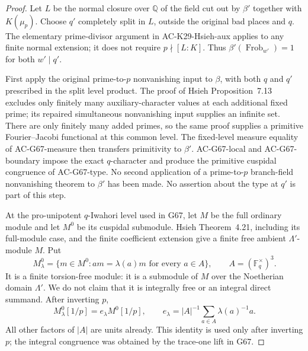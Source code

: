 \begin{proof}
Let $L$ be the normal closure over $\mathbb Q$ of the field
cut out by $\beta'$ together with $K(\mu_p)$.
Choose $q'$ completely split in $L$, outside the original
bad places and $q$.  The elementary prime-divisor argument
in AC-K29-Hsieh-aux applies to any finite normal extension;
it does not require $p\nmid[L:K]$.
Thus $\beta'(\operatorname{Frob}_{w'})=1$ for both
$w'\mid q'$.

First apply the original prime-to-$p$ nonvanishing input to
$\beta$, with both $q$ and $q'$ prescribed in the split
level product.  The proof of Hsieh Proposition~7.13 excludes
only finitely many auxiliary-character values at each
additional fixed prime; its repaired simultaneous
nonvanishing input supplies an infinite set.  There are
only finitely many added primes, so the same proof supplies
a primitive Fourier--Jacobi functional at this common level.
The fixed-level measure equality of AC-G67-measure then
transfers primitivity to $\beta'$.  AC-G67-local and
AC-G67-boundary impose the exact $q$-character and produce
the primitive cuspidal congruence of AC-G67-type.
No second application of a prime-to-$p$ branch-field
nonvanishing theorem to $\beta'$ has been made.
No assertion about the type at $q'$ is part of this step.

At the pro-unipotent $q$-Iwahori level used in G67, let $M$
be the full ordinary module and let $M^0$ be its cuspidal
submodule.  Hsieh Theorem~4.21, including its full-module
case, and the finite coefficient extension give a finite
free ambient $\Lambda'$-module $M$.
Put
\[
 M^0_\lambda=\{m\in M^0:a m=\lambda(a)m\text{ for every }a\in A\},
 \qquad A=(\mathbb F_q^\times)^3.
                                                        \tag{G70.4}
\]
It is a finite torsion-free module: it is a submodule of
$M$ over the Noetherian domain $\Lambda'$.
We do not claim that it is integrally free or an integral
direct summand.  After inverting $p$,
\[
 M^0_\lambda[1/p]=e_\lambda M^0[1/p],
 \qquad e_\lambda=|A|^{-1}\sum_{a\in A}\lambda(a)^{-1}a.
                                                        \tag{G70.5}
\]
All other factors of $|A|$ are units already.
This identity is used only after inverting $p$; the integral
congruence was obtained by the trace-one lift in G67.


\end{proof}
